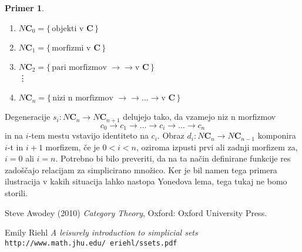 \documentclass[12pt,a4paper]{book}
\theoremstyle{definition}
\theoremstyle{plain}
\theoremstyle{definition}
\newtheorem{primer}{Primer}[section]
\theoremstyle{remark}
\newcommand{\cat}[1]{\textbf{#1}}
\renewcommand{\set}[1]{\{\,#1\,\}}
\begin{document}
\begin{primer}
\begin{enumerate}[label={}]
\item $N\cat{C}_0 = \set{\text{objekti v } \cat{C}}$
\item $N\cat{C}_1 = \set{\text{morfizmi v } \cat{C}}$
\item $N\cat{C}_2 = \set{\text{pari morfizmov } \rightarrow\rightarrow \text{v } \cat{C}}$ \\ %
\vdots
\item $N\cat{C}_n = \set{\text{nizi n morfizmov } \rightarrow\rightarrow\ldots\rightarrow \text{v } \cat{C}}$
\end{enumerate}
Degeneracije $s_i:N\cat{C}_n \to N\cat{C}_{n+1}$ delujejo tako, da vzamejo niz n morfizmov
$$ c_0 \rightarrow c_1 \rightarrow \ldots \rightarrow c_i \rightarrow \ldots \rightarrow c_n$$
in na $i$-tem mestu vstavijo identiteto na $c_i$. Obraz $d_i : N\cat{C}_n \to N\cat{C}_{n-1}$ komponira $i$-t in $i+1$ morfizem, če je $0 < i < n$, oziroma izpusti prvi ali zadnji morfizem za, $i = 0$ ali $i = n$.
Potrebno bi bilo preveriti, da na ta način definirane funkcije res zadoščajo relacijam za simplicirano množico. Ker je bil namen tega primera ilustracija v kakih situacija lahko nastopa Yonedova lema, tega tukaj ne bomo storili.
\end{primer}

\begin{thebibliography}{9}

Steve Awodey (2010)
\textit{Category Theory},
Oxford: Oxford University Press.

Emily Riehl
\textit{A leisurely introduction to simplicial sets}
\\\texttt{http://www.math.jhu.edu/~eriehl/ssets.pdf}
\end{thebibliography}
\end{document}
